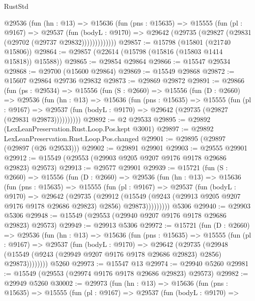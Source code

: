 \begin{lexlean}{RustStd}
\begin{coremodule}
          @29536
            (fun (hn : @13) =>
            @15636
              (fun (pns : @15635) =>
              @15555
                (fun (pl : @9167) =>
                @29537
                  (fun (bodyL : @9170) =>
                  @29642 (@29735 (@29827 (@29831 (@29702 (@29737 @29832)))))))))))))
@29857 := @15798 (@15801 (@21740 @15806))
@29864 := @29857 (@22614 (@15798 (@15816 (@15803 @1414 @15818)) @15588))
@29865 := @29854 @29864
@29866 := @15547 @29534
@29868 := @29700 (@15600 @29864)
@29869 := @15549 @29868
@29872 := @15607 @29864 @29736 @29832
@29873 := @29869 @29872
@29891 := @29866
    (fun (ps : @29534) =>
    @15556
      (fun (S : @2660) =>
      @15556
        (fun (D : @2660) =>
        @29536
          (fun (hn : @13) =>
          @15636
            (fun (pns : @15635) =>
            @15555
              (fun (pl : @9167) =>
              @29537 (fun (bodyL : @9170) => @29642 (@29735 (@29827 (@29831 @29873))))))))))
@29892 := @2 @29533
@29895 := @29892 (LexLeanPreservation.Rust.Loop.Pos.kept @3001)
@29897 := @29892 LexLeanPreservation.Rust.Loop.Pos.changed
@29901 := @29895 (@29897 (@29897 (@26 @29533)))
@29902 := @29891 @29901
@29903 := @29555 @29901
@29912 := @15549 (@29553 (@29903 @9205 @9207 @9176 @9178 @29686 @29823) @29573)
@29913 := @29577 @29901
@29939 := @15721
    (fun (S : @2660) =>
    @15556
      (fun (D : @2660) =>
      @29536
        (fun (hn : @13) =>
        @15636
          (fun (pns : @15635) =>
          @15555
            (fun (pl : @9167) =>
            @29537
              (fun (bodyL : @9170) =>
              @29642
                (@29735
                  (@29912
                    (@15549
                      (@9243 (@29913 @9205 @9207 @9176 @9178 @29686 @29823) @2856)
                      @29873)))))))))
    @5306
@29940 := @29903 @5306
@29948 := @15549 (@29553 (@29940 @9207 @9176 @9178 @29686 @29823) @29573)
@29949 := @29913 @5306
@29972 := @15721
    (fun (D : @2660) =>
    @29536
      (fun (hn : @13) =>
      @15636
        (fun (pns : @15635) =>
        @15555
          (fun (pl : @9167) =>
          @29537
            (fun (bodyL : @9170) =>
            @29642
              (@29735
                (@29948
                  (@15549 (@9243 (@29949 @9207 @9176 @9178 @29686 @29823) @2856) @29873))))))))
    @5260
@29973 := @15547 @13
@29974 := @29940 @5260
@29981 := @15549 (@29553 (@29974 @9176 @9178 @29686 @29823) @29573)
@29982 := @29949 @5260
@30002 := @29973
    (fun (hn : @13) =>
    @15636
      (fun (pns : @15635) =>
      @15555
        (fun (pl : @9167) =>
        @29537
          (fun (bodyL : @9170) =>

\end{coremodule}
\end{lexlean}
